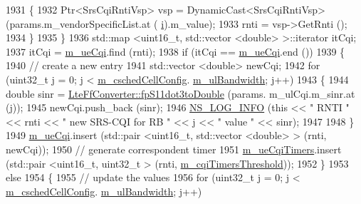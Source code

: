 \begin{DoxyCode}
1931               \{
1932                 Ptr<SrsCqiRntiVsp> vsp = DynamicCast<SrsCqiRntiVsp> (params.m\_vendorSpecificList.at (
      \hyperlink{bernuolliDistribution_8m_a6f6ccfcf58b31cb6412107d9d5281426}{i}).m\_value);
1933                 rnti = vsp->GetRnti ();
1934               \}
1935           \}
1936         std::map <uint16\_t, std::vector <double> >::iterator itCqi;
1937         itCqi = \hyperlink{classns3_1_1TtaFfMacScheduler_ac07e60af8c68f1cfac9b8666119af78f}{m\_ueCqi}.find (rnti);
1938         \textcolor{keywordflow}{if} (itCqi == \hyperlink{classns3_1_1TtaFfMacScheduler_ac07e60af8c68f1cfac9b8666119af78f}{m\_ueCqi}.end ())
1939           \{
1940             \textcolor{comment}{// create a new entry}
1941             std::vector <double> newCqi;
1942             \textcolor{keywordflow}{for} (uint32\_t j = 0; j < \hyperlink{classns3_1_1TtaFfMacScheduler_af263a06ea69ff1d096ddb48df0ac7f81}{m\_cschedCellConfig}.
      \hyperlink{structns3_1_1FfMacCschedSapProvider_1_1CschedCellConfigReqParameters_a5ab5b102878e6e7e7727a14af4a64d2f}{m\_ulBandwidth}; j++)
1943               \{
1944                 \textcolor{keywordtype}{double} sinr = \hyperlink{classns3_1_1LteFfConverter_aa5d8c2a8f988dbd63da91818c18666eb}{LteFfConverter::fpS11dot3toDouble} (params.
      m\_ulCqi.m\_sinr.at (j));
1945                 newCqi.push\_back (sinr);
1946                 \hyperlink{group__logging_gafbd73ee2cf9f26b319f49086d8e860fb}{NS\_LOG\_INFO} (\textcolor{keyword}{this} << \textcolor{stringliteral}{" RNTI "} << rnti << \textcolor{stringliteral}{" new SRS-CQI for RB  "} << j << \textcolor{stringliteral}{" value
       "} << sinr);
1947 
1948               \}
1949             \hyperlink{classns3_1_1TtaFfMacScheduler_ac07e60af8c68f1cfac9b8666119af78f}{m\_ueCqi}.insert (std::pair <uint16\_t, std::vector <double> > (rnti, newCqi));
1950             \textcolor{comment}{// generate correspondent timer}
1951             \hyperlink{classns3_1_1TtaFfMacScheduler_adb17b15e869d53e4244bf77f3f842f67}{m\_ueCqiTimers}.insert (std::pair <uint16\_t, uint32\_t > (rnti, 
      \hyperlink{classns3_1_1TtaFfMacScheduler_a3dd8aa322782db3d0f2bbaf9fede6fca}{m\_cqiTimersThreshold}));
1952           \}
1953         \textcolor{keywordflow}{else}
1954           \{
1955             \textcolor{comment}{// update the values}
1956             \textcolor{keywordflow}{for} (uint32\_t j = 0; j < \hyperlink{classns3_1_1TtaFfMacScheduler_af263a06ea69ff1d096ddb48df0ac7f81}{m\_cschedCellConfig}.
      \hyperlink{structns3_1_1FfMacCschedSapProvider_1_1CschedCellConfigReqParameters_a5ab5b102878e6e7e7727a14af4a64d2f}{m\_ulBandwidth}; j++)

\end{DoxyCode}
